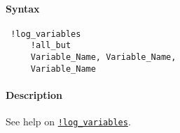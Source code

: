 


	\paragraph{Syntax}
 
 \begin{verbatim}
 !log_variables
     !all_but
     Variable_Name, Variable_Name, 
     Variable_Name
 \end{verbatim}
 
 \paragraph{Description}
 
 See help on \href{modellang/logvariables}{\texttt{!log\_variables}}.


